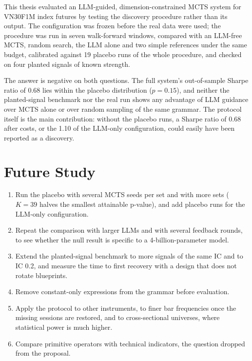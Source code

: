 \documentclass[12pt,a4paper,oneside]{book}
\theoremstyle{definition}
\begin{document}
This thesis evaluated an LLM-guided, dimension-constrained MCTS system for VN30F1M index futures by testing the discovery procedure rather than its output. The configuration was frozen before the real data were used; the procedure was run in seven walk-forward windows, compared with an LLM-free MCTS, random search, the LLM alone and two simple references under the same budget, calibrated against 19 placebo runs of the whole procedure, and checked on four planted signals of known strength.

The answer is negative on both questions. The full system's out-of-sample Sharpe ratio of 0.68 lies within the placebo distribution ($p = 0.15$), and neither the planted-signal benchmark nor the real run shows any advantage of LLM guidance over MCTS alone or over random sampling of the same grammar. The protocol itself is the main contribution: without the placebo runs, a Sharpe ratio of 0.68 after costs, or the 1.10 of the LLM-only configuration, could easily have been reported as a discovery.

\section{Future Study}

\begin{enumerate}
  \item Run the placebo with several MCTS seeds per set and with more sets ($K = 39$ halves the smallest attainable p-value), and add placebo runs for the LLM-only configuration.
  \item Repeat the comparison with larger LLMs and with several feedback rounds, to see whether the null result is specific to a 4-billion-parameter model.
  \item Extend the planted-signal benchmark to more signals of the same IC and to IC 0.2, and measure the time to first recovery with a design that does not rotate blueprints.
  \item Remove constant-only expressions from the grammar before evaluation.
  \item Apply the protocol to other instruments, to finer bar frequencies once the missing sessions are restored, and to cross-sectional universes, where statistical power is much higher.
  \item Compare primitive operators with technical indicators, the question dropped from the proposal.
\end{enumerate}
\end{document}
